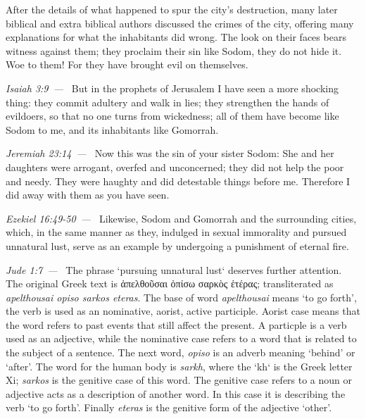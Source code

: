 \documentclass[10pt]{article}
\let\oldquote\quote
\let\endoldquote\endquote
\renewenvironment{quote}[2][]
  {\if\relax\detokenize{#1}\relax
     \def\quoteauthor{#2}%
   \else
     \def\quoteauthor{#2~---~#1}%
   \fi
   \oldquote}
  {\par\nobreak\smallskip\hfill\textit{\quoteauthor}%
   \endoldquote\addvspace{\bigskipamount}}
\begin{document}
After the details of what happened to spur the city's destruction, many later biblical and extra biblical authors discussed the crimes of the city, offering many explanations for what the inhabitants did wrong.
\begin{quote}{Isaiah 3:9}
The look on their faces bears witness against them;
    they proclaim their sin like Sodom,
    they do not hide it.
Woe to them!
    For they have brought evil on themselves.
\end{quote}
\begin{quote}{Jeremiah 23:14}
But in the prophets of Jerusalem
    I have seen a more shocking thing:
they commit adultery and walk in lies;
    they strengthen the hands of evildoers,
    so that no one turns from wickedness;
all of them have become like Sodom to me,
    and its inhabitants like Gomorrah.
\end{quote}
\begin{quote}{Ezekiel 16:49-50}
Now this was the sin of your sister Sodom: She and her daughters were arrogant, overfed and unconcerned; they did not help the poor and needy. They were haughty and did detestable things before me. Therefore I did away with them as you have seen.
\end{quote}
\begin{quote}{Jude 1:7}
Likewise, Sodom and Gomorrah and the surrounding cities, which, in the same manner as they, indulged in sexual immorality and pursued unnatural lust, serve as an example by undergoing a punishment of eternal fire.
\end{quote}
The phrase `pursuing unnatural lust` deserves further attention. The original Greek text is {\textgreekfont ἀπελθοῦσαι ὀπίσω σαρκὸς ἑτέρας}; transliterated as \textit{apelthousai opiso sarkos eteras}. The base of word \textit{apelthousai} means `to go forth', the verb is used as an nominative, aorist, active participle. Aorist case means that the word refers to past events that still affect the present. A particple is a verb used as an adjective, while the nominative case refers to a word that is related to the subject of a sentence.  The next word, \textit{opiso} is an adverb meaning `behind' or `after'. The word for the human body is \textit{sarkh}, where the `kh` is the Greek letter Xi; \textit{sarkos} is the genitive case of this word. The genitive case refers to a noun or adjective acts as a description of another word. In this case it is describing the verb `to go forth'. Finally \textit{eteras} is the genitive form of the adjective `other'. 
\end{document}
